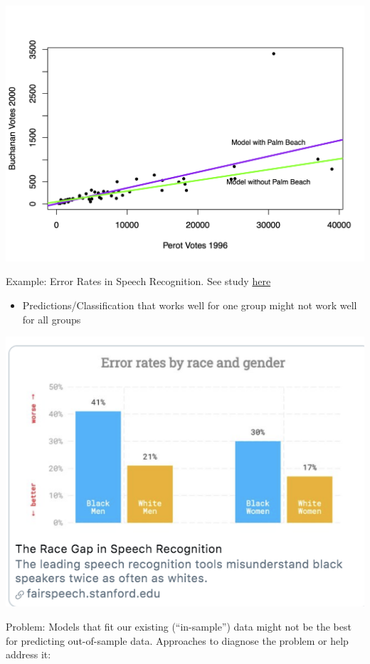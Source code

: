 \documentclass[
  letterpaper,
  DIV=11,
  numbers=noendperiod]{scrreprt}
\providecommand{\tightlist}{%
  \setlength{\itemsep}{0pt}\setlength{\parskip}{0pt}}\usepackage{longtable,booktabs,array}
\begin{document}
\includegraphics{images/overfit.png}

Example: Error Rates in Speech Recognition. See study
\href{https://news.stanford.edu/2020/03/23/automated-speech-recognition-less-accurate-blacks/}{here}

\begin{itemize}
\tightlist
\item
  Predictions/Classification that works well for one group might not
  work well for all groups
\end{itemize}

\includegraphics{images/speecherrors.png}

Problem: Models that fit our existing (``in-sample'') data might not be
the best for predicting out-of-sample data. Approaches to diagnose the
problem or help address it:
\end{document}
